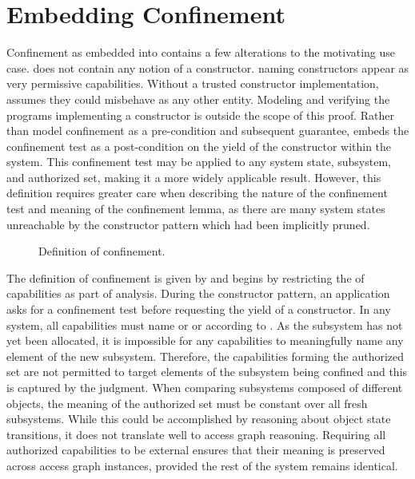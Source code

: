 \section{Embedding Confinement}

Confinement as embedded into \TMmodelName{} contains a few alterations to the motivating use case.
\TMmodelName{} does not contain any notion of a constructor.
\xmakefirstuc{\TMcaps} naming constructors appear as very permissive \TMsend{} capabilities.
Without a trusted constructor implementation, \TMmodelName{} assumes they could misbehave as any other entity.
Modeling and verifying the programs implementing a constructor is outside the scope of this proof.
Rather than model confinement as a pre-condition and subsequent guarantee, \TMmodelName{} embeds the confinement test as a post-condition on the yield of the constructor within the system.
This confinement test may be applied to any system state, subsystem, and authorized set, making it a more widely applicable result.
However, this definition requires greater care when describing the nature of the confinement test and meaning of the confinement lemma, as there are many system states unreachable by the constructor pattern which had been implicitly pruned.


\begin{figure}
  \COQDOCauthorizedConfinedSubsystem
  \COQDOCconfinedSubsystem
  
\caption{Definition of confinement. \label{fig:confinement:authSet}}
\end{figure}

The definition of confinement is given by \COQauthorizedConfinedSubsystem{} and begins by restricting the \TMauthorizedSet{} of capabilities as part of analysis.
During the constructor pattern, an application asks for a confinement test before requesting the yield of a constructor.
In any system, all capabilities must name \emph{\TMalive{}} or \emph{\TMdead{}} or \TMobjs{} according to \COQextantCapabilities{}.
As the subsystem has not yet been allocated, it is impossible for any capabilities to meaningfully name any element of the new subsystem.
Therefore, the capabilities forming the authorized set are not permitted to target elements of the subsystem being confined and this is captured by the \COQnovelCapabilities{} judgment.
When comparing subsystems composed of different objects, the meaning of the authorized set must be constant over all fresh subsystems.
While this could be accomplished by reasoning about object state transitions, it does not translate well to access graph reasoning.
Requiring all authorized capabilities to be external ensures that their meaning is preserved across access graph instances, provided the rest of the system remains identical.


